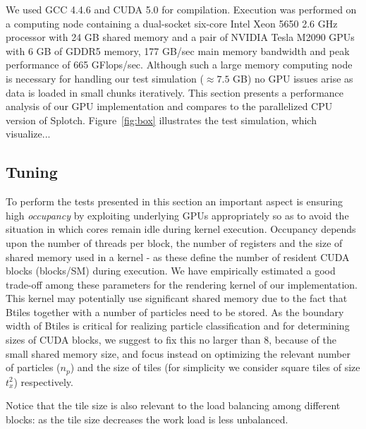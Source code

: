 \documentclass[1p]{elsarticle}
\begin{document}
We used GCC 4.4.6 and CUDA 5.0 for compilation. Execution was performed on a computing node containing a dual-socket six-core Intel Xeon 5650 2.6 GHz processor with 24 GB shared memory and a pair of NVIDIA Tesla M2090 GPUs with 6 GB of GDDR5 memory, 177 GB/sec main memory bandwidth and peak performance of 665 GFlops/sec. Although such a large memory computing node is necessary for handling our test simulation ($\approx 7.5$ GB) no GPU issues arise as data is loaded in small chunks iteratively. This section presents a performance analysis of our GPU implementation and compares to the parallelized CPU version of Splotch. Figure~\ref{fig:box} illustrates the test simulation, which visualize...

\subsection{Tuning}
\label{sec:gpuperf}
To perform the tests presented in this section an important aspect is ensuring high {\it occupancy} by exploiting underlying GPUs appropriately so as to avoid the situation in which cores remain idle during kernel execution. Occupancy depends upon the number of threads per block, the number of registers and the size of shared memory used in a kernel - as these define the number of resident CUDA blocks (blocks/SM) during execution. We have empirically estimated a good trade-off among these parameters for the rendering kernel of our implementation. This kernel may potentially use significant shared memory due to the fact that Btiles together with a number of particles need to be stored. As the boundary width of Btiles is critical for realizing particle classification and for determining sizes of CUDA blocks, we suggest to fix this no larger than 8, because of the small shared memory size, and focus instead on optimizing the relevant number of particles ($n_p$) and the size of tiles (for simplicity we consider square tiles of size $t_x^2$) respectively.
 
Notice that the tile size is also relevant to the load balancing among different blocks: as the tile size decreases the work load is less unbalanced. 
\end{document}
